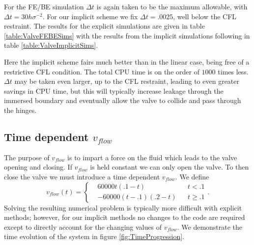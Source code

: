 \documentclass[preprint,12pt]{elsarticle}
\begin{document}
For the FE/BE simulation $\Delta t$ is again taken to be the maximum allowable, with $\Delta t = 30h\sigma^{-2}$. For our implicit scheme we fix $\Delta t=.0025$, well below the CFL restraint. The results for the explicit simulations are given in table \ref{table:ValveFEBESims} with the results from the implicit simulations following in table \ref{table:ValveImplicitSims}.

Here the implicit scheme fairs much better than in the linear case, being free of a restrictive CFL condition. The total CPU time is on the order of $1000$ times less. $\Delta t$ may be taken even larger, up to the CFL restraint, leading to even greater savings in CPU time, but this will typically increase leakage through the immersed boundary and eventually allow the valve to collide and pass through the hinges.

\subsection{Time dependent $v_{flow}$}
The purpose of $v_{flow}$ is to impart a force on the fluid which leads to the valve opening and closing. If $v_{flow}$ is held constant we can only open the valve. To then close the valve we must introduce a time dependent $v_{flow}$.
We define
\begin{equation}
v_{flow}(t) =
\left\{
\begin{array}{cccc}
&60000t(.1-t)& &t<.1 \\
&-60000(t-.1)(.2-t)& &t\geq .1
\end{array}
\right. .
\label{eqn:VariableFlow}
\end{equation}
Solving the resulting numerical problem is typically more difficult with explicit methods; however, for our implicit methods no changes to the code are required except to directly account for the changing values of $v_{flow}$. We demonstrate the time evolution of the system in figure \ref{fig:TimeProgression}.
\end{document}
